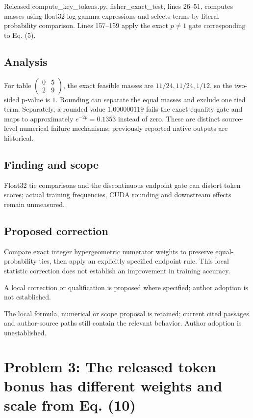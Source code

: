 \documentclass[11pt]{article}
\begin{document}
Released compute\_key\_tokens.py, fisher\_exact\_test, lines 26–51, computes masses using float32 log-gamma expressions and selects terms by literal probability comparison. Lines 157–159 apply the exact \(p\ne1\) gate corresponding to Eq. (5).

\subsection*{Analysis}

For table \(\begin{pmatrix}0&5\\2&9\end{pmatrix}\), the exact feasible masses are \(11/24,11/24,1/12\), so the two-sided p-value is \(1\). Rounding can separate the equal masses and exclude one tied term. Separately, a rounded value \(1.000000119\) fails the exact equality gate and maps to approximately \(e^{-2p}=0.1353\) instead of zero. These are distinct source-level numerical failure mechanisms; previously reported native outputs are historical.

\subsection*{Finding and scope}

Float32 tie comparisons and the discontinuous endpoint gate can distort token scores; actual training frequencies, CUDA rounding and downstream effects remain unmeasured.

\subsection*{Proposed correction}

Compare exact integer hypergeometric numerator weights to preserve equal-probability ties, then apply an explicitly specified endpoint rule. This local statistic correction does not establish an improvement in training accuracy.

A local correction or qualification is proposed where specified; author adoption is not established.

The local formula, numerical or scope proposal is retained; current cited passages and author-source paths still contain the relevant behavior. Author adoption is unestablished.

\section*{Problem 3: The released token bonus has different weights and scale from Eq. (10)}
\end{document}
